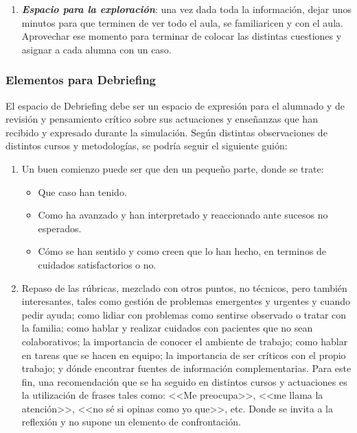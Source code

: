 \begin{enumerate}[topsep=0pt, partopsep=0pt,itemsep=0pt,parsep=0pt]
    \item \textbf{\textit{Espacio para la exploración}}: una vez dada toda la información, dejar unos minutos para que terminen de ver todo el aula, se familiaricen y con el aula. Aprovechar ese momento para terminar de colocar las distintas cuestiones y asignar a cada alumna con un caso.
\end{enumerate}
\subsubsection{Elementos para Debriefing}
El espacio de Debriefing debe ser un espacio de expresión para el alumnado y de revisión y pensamiento crítico sobre sus actuaciones y enseñanzas que han recibido y expresado durante la simulación. Según distintas observaciones de distintos cursos y metodologías, se podría seguir el siguiente guión:
\begin{enumerate}[topsep=0pt, partopsep=0pt,itemsep=0pt,parsep=0pt]
    \item Un buen comienzo puede ser que den un pequeño parte, donde se trate:
    \begin{itemize}[topsep=0pt, partopsep=0pt,itemsep=0pt,parsep=0pt]
        \item Que caso han tenido.
        \item Como ha avanzado y han interpretado y reaccionado ante sucesos no esperados.
        \item Cómo se han sentido y como creen que lo han hecho, en terminos de cuidados satisfactorios o no.
    \end{itemize}
    \item Repaso de las rúbricas, mezclado con otros puntos, no técnicos, pero también interesantes, tales como gestión de problemas emergentes y urgentes y cuando pedir ayuda; como lidiar con problemas como sentirse observado o tratar con la familia; como hablar y realizar cuidados con pacientes que no sean colaborativos; la importancia de conocer el ambiente de trabajo; como hablar en tareas que se hacen en equipo; la importancia de ser críticos con el propio trabajo; y dónde encontrar fuentes de información complementarias.
        \subitem Para este fin, una recomendación que se ha seguido en distintos cursos y actuaciones es la utilización de frases tales como: <<Me preocupa>>, <<me llama la atención>>, <<no sé si opinas como yo que>>, etc. Donde se invita a la reflexión y no supone un elemento de confrontación.
\end{enumerate}





